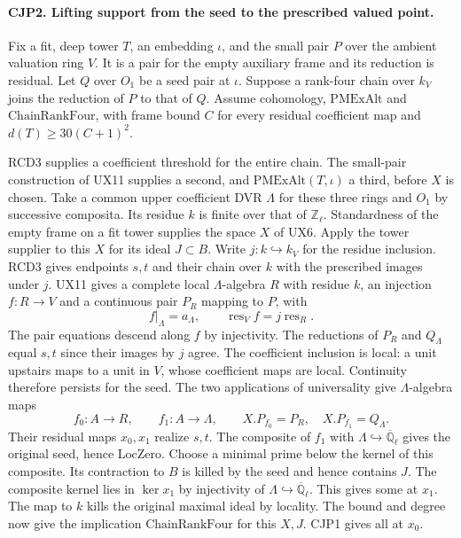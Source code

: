 \paragraph{CJP2. Lifting support from the seed to the prescribed valued point.}
Fix a fit, deep tower $T$, an embedding $\iota$, and the small pair
$P$ over the ambient valuation ring $V$. It is a pair for the empty
auxiliary frame and its reduction is residual. Let $Q$ over $O_1$
be a seed pair at $\iota$. Suppose a rank-four chain over $k_V$ joins
the reduction of $P$ to that of $Q$. Assume cohomology,
$\mathrm{PMExAlt}$ and $\mathrm{ChainRankFour}$, with frame bound
$C$ for every residual coefficient map and $d(T)\ge30(C+1)^2$.

RCD3 supplies a coefficient threshold for the entire chain. The small-pair
construction of UX11 supplies a second, and $\mathrm{PMExAlt}(T,\iota)$
a third, before $X$ is chosen. Take a common upper coefficient DVR
$\Lambda$ for these three rings and $O_1$ by successive composita. Its
residue $k$ is finite over that of $\mathbb Z_\ell$. Standardness of
the empty frame on a fit tower supplies the space $X$ of UX6. Apply
the tower supplier to this $X$ for its ideal $J\subset B$.
Write $j:k\hookrightarrow k_V$ for the residue inclusion. RCD3 gives
endpoints $s,t$ and their chain over $k$ with the prescribed images
under $j$. UX11 gives a complete local $\Lambda$-algebra $R$ with
residue $k$, an injection $f:R\to V$ and a continuous pair $P_R$
mapping to $P$, with
\[
 f|_\Lambda=a_\Lambda,\qquad
 \operatorname{res}_V f=j\operatorname{res}_R .
\]
The pair equations descend along $f$ by injectivity. The reductions of
$P_R$ and $Q_\Lambda$ equal $s,t$ since their images by $j$ agree. The
coefficient inclusion is local: a unit upstairs maps to a unit in $V$,
whose coefficient maps are local. Continuity therefore persists for the
seed. The two applications of universality give $\Lambda$-algebra maps
\[
 f_0:A\longrightarrow R,\qquad f_1:A\longrightarrow\Lambda ,
 \qquad X.P_{f_0}=P_R,\quad X.P_{f_1}=Q_\Lambda .
\]
Their residual maps $x_0,x_1$ realize $s,t$. The composite of $f_1$
with $\Lambda\hookrightarrow\overline{\mathbb Q}_\ell$ gives the
original seed, hence $\mathrm{LocZero}$. Choose a minimal prime below
the kernel of this composite. Its contraction to $B$ is killed by the
seed and hence contains $J$. The composite kernel lies in $\ker x_1$
by injectivity of $\Lambda\hookrightarrow\overline{\mathbb Q}_\ell$.
This gives some at $x_1$. The map to $k$ kills the original maximal
ideal by locality. The bound and degree now give the implication
$\mathrm{ChainRankFour}$ for this $X,J$. CJP1 gives all at $x_0$.


